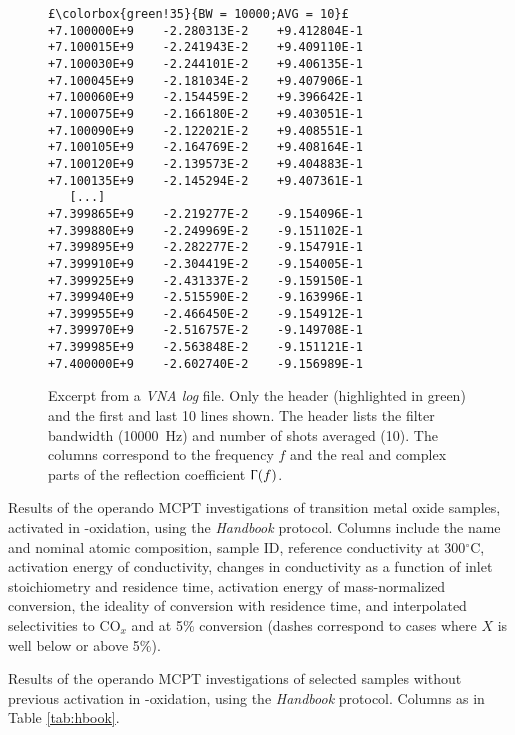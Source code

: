 \documentclass[12pt]{article}
\begin{document}
\begin{figure}[tbh]
\begin{lstlisting}[escapechar=£]
£\colorbox{green!35}{BW = 10000;AVG = 10}£
+7.100000E+9	-2.280313E-2	+9.412804E-1
+7.100015E+9	-2.241943E-2	+9.409110E-1
+7.100030E+9	-2.244101E-2	+9.406135E-1
+7.100045E+9	-2.181034E-2	+9.407906E-1
+7.100060E+9	-2.154459E-2	+9.396642E-1
+7.100075E+9	-2.166180E-2	+9.403051E-1
+7.100090E+9	-2.122021E-2	+9.408551E-1
+7.100105E+9	-2.164769E-2	+9.408164E-1
+7.100120E+9	-2.139573E-2	+9.404883E-1
+7.100135E+9	-2.145294E-2	+9.407361E-1
   [...]
+7.399865E+9	-2.219277E-2	-9.154096E-1
+7.399880E+9	-2.249969E-2	-9.151102E-1
+7.399895E+9	-2.282277E-2	-9.154791E-1
+7.399910E+9	-2.304419E-2	-9.154005E-1
+7.399925E+9	-2.431337E-2	-9.159150E-1
+7.399940E+9	-2.515590E-2	-9.163996E-1
+7.399955E+9	-2.466450E-2	-9.154912E-1
+7.399970E+9	-2.516757E-2	-9.149708E-1
+7.399985E+9	-2.563848E-2	-9.151121E-1
+7.400000E+9	-2.602740E-2	-9.156989E-1
\end{lstlisting}
\centering
\caption{Excerpt from a \emph{VNA log} file. Only the header (highlighted in green) and the first and last 10 lines shown. The header lists the filter bandwidth (10000~Hz) and number of shots averaged (10). The columns correspond to the frequency $f$ and the real and complex parts of the reflection coefficient $\Upgamma(f)$. \label{fig:vnalog}}
\end{figure}

\clearpage
\begin{landscape}
\begin{table}[p]
\caption{Results of the operando MCPT investigations of transition metal oxide samples, activated in -oxidation, using the \emph{Handbook} protocol. Columns include the name and nominal atomic composition, sample ID, reference conductivity at 300$^\circ$C, activation energy of conductivity, changes in conductivity as a function of inlet stoichiometry and residence time, activation energy of mass-normalized conversion, the ideality of conversion with residence time, and interpolated selectivities to CO$_x$ and  at 5\% conversion (dashes correspond to cases where $X$ is well below or above 5\%). \label{tab:hbook}}
\small

\end{table}

\begin{table}[p]
\caption{Results of the operando MCPT investigations of selected samples without previous activation in -oxidation, using the \emph{Handbook} protocol. Columns as in Table \ref{tab:hbook}.}
\small

\end{table}
\end{landscape}
\end{document}
